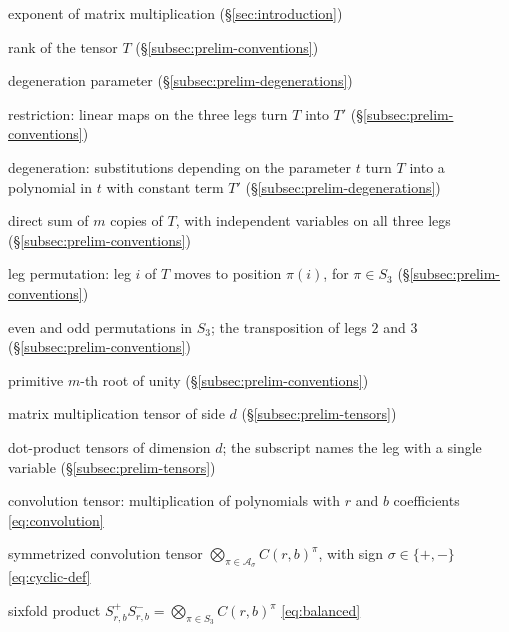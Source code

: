 {\begin{list}{}{\setlength{\leftmargin}{0.22\textwidth}%
 \setlength{\labelwidth}{0.2\textwidth}\setlength{\labelsep}{0.02\textwidth}%
 \setlength{\itemsep}{1pt}\setlength{\parsep}{0pt}\setlength{\topsep}{0pt}%
 \renewcommand{\makelabel}[1]{#1\hfil}}
\item[\(\omega\)] exponent of matrix multiplication
 (\S\ref{sec:introduction})
\item[\(\R(T)\)] rank of the tensor \(T\) (\S\ref{subsec:prelim-conventions})
\item[\(t\)] degeneration parameter (\S\ref{subsec:prelim-degenerations})
\item[\(T\restr T'\)] restriction: linear maps on the three legs turn
 \(T\) into \(T'\) (\S\ref{subsec:prelim-conventions})
\item[\(T\degen T'\)] degeneration: substitutions depending on the
 parameter \(t\) turn \(T\) into a polynomial in \(t\) with constant term
 \(T'\) (\S\ref{subsec:prelim-degenerations})
\item[\(mT\)] direct sum of \(m\) copies of \(T\), with independent
 variables on all three legs (\S\ref{subsec:prelim-conventions})
\item[\(T^\pi\)] leg permutation: leg \(i\) of \(T\) moves to position
 \(\pi(i)\), for \(\pi\in S_3\) (\S\ref{subsec:prelim-conventions})
\item[\(\mathcal A_+\), \(\mathcal A_-\), \((23)\)] even and odd
 permutations in \(S_3\); the transposition of legs \(2\) and \(3\)
 (\S\ref{subsec:prelim-conventions})
\item[\(\zeta_m\)] primitive \(m\)-th root of unity
 (\S\ref{subsec:prelim-conventions})
\item[\(\MM_d\)] matrix multiplication tensor of side \(d\)
 (\S\ref{subsec:prelim-tensors})
\item[\(B_X(d)\), \(B_Y(d)\), \(B_Z(d)\)] dot-product tensors of
 dimension \(d\); the subscript names the leg with a single variable
 (\S\ref{subsec:prelim-tensors})
\item[\(C(r,b)\)] convolution tensor: multiplication of polynomials with
 \(r\) and \(b\) coefficients \eqref{eq:convolution}
\item[\(S^\sigma_{r,b}\)] symmetrized convolution tensor
 \(\bigotimes_{\pi\in\mathcal A_\sigma}C(r,b)^\pi\), with sign
 \(\sigma\in\{+,-\}\) \eqref{eq:cyclic-def}
\item[\(Q_{r,b}\)] sixfold product
 \(S^+_{r,b}S^-_{r,b}=\bigotimes_{\pi\in S_3}C(r,b)^\pi\)
 \eqref{eq:balanced}
\end{list}

}
